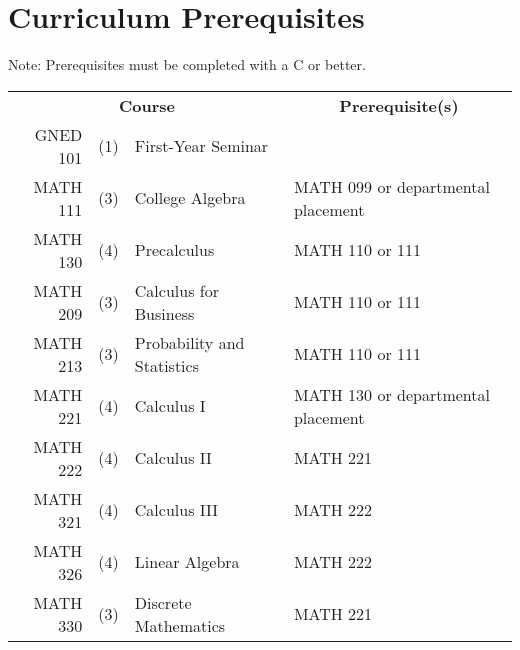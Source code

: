 \section{Curriculum Prerequisites}
\begin{center}Note: Prerequisites must be completed with a C or better.\end{center}
\setlength{\tabcolsep}{5pt}
\setlength{\arrayrulewidth}{1px}

\begin{reqgroup}[left*=1pt,right*=1pt,bottom=0pt]{}
\centering\small
{}
\begin{tabularx}{\textwidth}{ r c l  | X }
\multicolumn{3}{c}{\normalsize\textbf{Course}} & \multicolumn{1}{c}{\normalsize\textbf{Prerequisite(s)}}\\
\arrayrulecolor{csugold}\hline
	GNED 101 & (1) & First-Year Seminar & \\

	MATH 111 & (3) & College Algebra & MATH 099 or departmental placement \\
	MATH 130 & (4) & Precalculus & MATH 110 or 111 \\
	MATH 209 & (3) & Calculus for Business & MATH 110 or 111 \\
	MATH 213 & (3) & Probability and Statistics & MATH 110 or 111 \\
	MATH 221 & (4) & Calculus I & MATH 130 or departmental placement \\
	MATH 222 & (4) & Calculus II & MATH 221 \\
	MATH 321 & (4) & Calculus III & MATH 222 \\
	MATH 326 & (4) & Linear Algebra & MATH 222 \\
	MATH 330 & (3) & Discrete Mathematics & MATH 221  \\


\end{tabularx}
\end{reqgroup}
